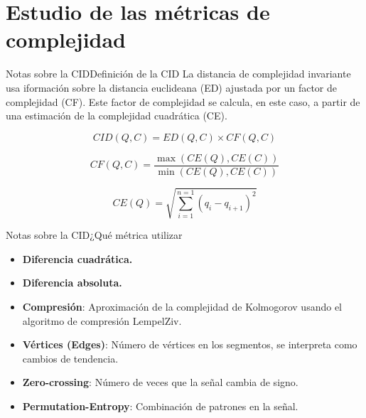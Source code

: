 \documentclass[12pt, aspectratio=169]{beamer} %
\begin{document}
\section{Estudio de las métricas de complejidad}

\begin{frame}{Notas sobre la CID}{Definición de la CID}
  La distancia de complejidad invariante usa iformación sobre la distancia euclideana (ED) ajustada por un factor de complejidad (CF).
  Este factor de complejidad se calcula, en este caso, a partir de una estimación de la complejidad cuadrática (CE). 

  \[ CID(Q,C) = ED(Q,C) \times CF(Q,C) \]

  \[ CF(Q,C) = \frac
    { \max{ (CE(Q),CE(C))} }
    { \min{(CE(Q),CE(C))}  }
  \]

  \[ CE(Q) = \sqrt{ \sum_{i=1}^{n=1}{  ( q_i - q_{i+1} )^2 } }  \]

\end{frame}

\begin{frame}{Notas sobre la CID}{¿Qué métrica utilizar}
  \begin{itemize}
  \item \textbf{Diferencia cuadrática.}
  \item \textbf{Diferencia absoluta.}
  \item \textbf{Compresión}: Aproximación de la complejidad de Kolmogorov usando el algoritmo de compresión LempelZiv.
  \item \textbf{Vértices (Edges)}: Número de vértices en los segmentos, se interpreta como cambios de tendencia.
  \item \textbf{Zero-crossing}: Número de veces que la señal cambia de signo.
  \item \textbf{Permutation-Entropy}: Combinación de patrones en la señal.
  \end{itemize}
\end{frame}
\end{document}
